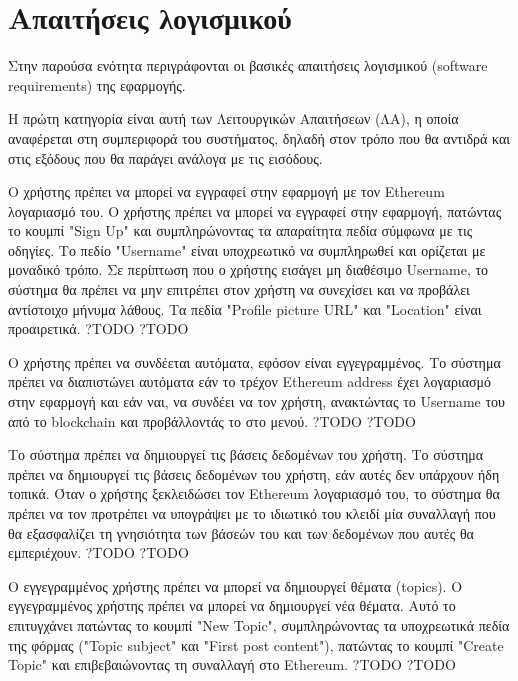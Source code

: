 \section{Απαιτήσεις λογισμικού} \label{section:3-3-requirements}

Στην παρούσα ενότητα περιγράφονται οι βασικές απαιτήσεις λογισμικού (software requirements) της εφαρμογής.

Η πρώτη κατηγορία είναι αυτή των Λειτουργικών Απαιτήσεων (ΛΑ), η οποία αναφέρεται στη συμπεριφορά του συστήματος, δηλαδή στον τρόπο που θα αντιδρά και στις εξόδους που θα παράγει ανάλογα με τις εισόδους.

\begin{enumerate}[label=\textbf{<ΛΑ-\arabic*>}, leftmargin=\parindent, align=left, labelwidth=\parindent, labelsep=0pt]
	\sysReqItem
		{\label{srs:functional-srs-sign-up}}
		{Ο χρήστης πρέπει να μπορεί να εγγραφεί στην εφαρμογή με τον Ethereum λογαριασμό του.}
		{Ο χρήστης πρέπει να μπορεί να εγγραφεί στην εφαρμογή, πατώντας το κουμπί "Sign Up" και συμπληρώνοντας τα απαραίτητα πεδία σύμφωνα με τις οδηγίες. Το πεδίο "Username" είναι υποχρεωτικό να συμπληρωθεί και ορίζεται με μοναδικό τρόπο. Σε περίπτωση που ο χρήστης εισάγει μη διαθέσιμο Username, το σύστημα θα πρέπει να μην επιτρέπει στον χρήστη να συνεχίσει και να προβάλει αντίστοιχο μήνυμα λάθους. Τα πεδία "Profile picture URL" και "Location" είναι προαιρετικά.}
		{?}{TODO}
		{?}{TODO}

	\sysReqItem
		{\label{srs:functional-srs-sign-in}}
		{Ο χρήστης πρέπει να συνδέεται αυτόματα, εφόσον είναι εγγεγραμμένος.}
		{Το σύστημα πρέπει να διαπιστώνει αυτόματα εάν το τρέχον Ethereum address έχει λογαριασμό στην εφαρμογή και εάν ναι, να συνδέει να τον χρήστη, ανακτώντας το Username του από το blockchain και προβάλλοντάς το στο μενού.}
		{?}{TODO}
		{?}{TODO}

	\sysReqItem
		{\label{srs:functional-srs-create-user-databases}}
		{Το σύστημα πρέπει να δημιουργεί τις βάσεις δεδομένων του χρήστη.}
		{Το σύστημα πρέπει να δημιουργεί τις βάσεις δεδομένων του χρήστη, εάν αυτές δεν υπάρχουν ήδη τοπικά. Όταν ο χρήστης ξεκλειδώσει τον Ethereum λογαριασμό του, το σύστημα θα πρέπει να τον προτρέπει να υπογράψει με το ιδιωτικό του κλειδί μία συναλλαγή που θα εξασφαλίζει τη γνησιότητα των βάσεών του και των δεδομένων που αυτές θα εμπεριέχουν.}
		{?}{TODO}
		{?}{TODO}

	\sysReqItem
		{\label{srs:functional-srs-create-topic}}
		{Ο εγγεγραμμένος χρήστης πρέπει να μπορεί να δημιουργεί θέματα (topics).}
		{Ο εγγεγραμμένος χρήστης πρέπει να μπορεί να δημιουργεί νέα θέματα. Αυτό το επιτυγχάνει πατώντας το κουμπί "New Topic", συμπληρώνοντας τα υποχρεωτικά πεδία της φόρμας ("Topic subject" και "First post content"), πατώντας το κουμπί "Create Topic" και επιβεβαιώνοντας τη συναλλαγή στο Ethereum.}
		{?}{TODO}
		{?}{TODO}


\end{enumerate}
